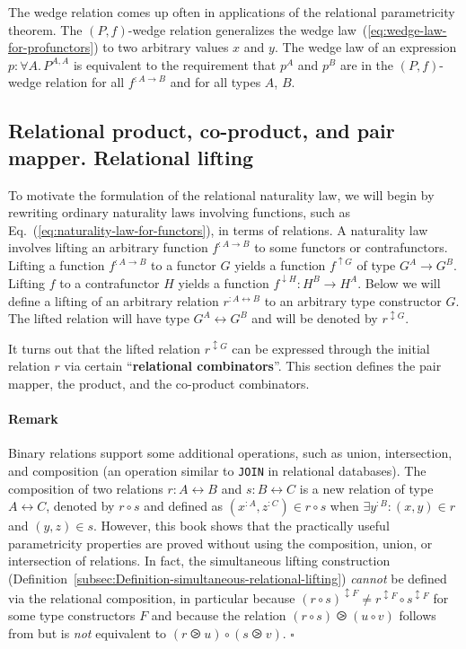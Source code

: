 The wedge relation comes up often in applications of the relational
parametricity theorem. The $\left(P,f\right)$-wedge relation generalizes
the wedge law~(\ref{eq:wedge-law-for-profunctors}) to two arbitrary
values $x$ and $y$. The wedge law of an expression $p:\forall A.\,P^{A,A}$
is equivalent to the requirement that $p^{A}$ and $p^{B}$ are in
the $\left(P,f\right)$-wedge relation for all $f^{:A\rightarrow B}$
and for all types $A$, $B$. 

\subsection{Relational product, co-product, and pair mapper. Relational lifting}

To motivate the formulation of the relational naturality law, we will
begin by rewriting ordinary naturality laws involving functions, such
as Eq.~(\ref{eq:naturality-law-for-functors}), in terms of relations.
A naturality law involves lifting an arbitrary function $f^{:A\rightarrow B}$
to some functors or contrafunctors. Lifting a function $f^{:A\rightarrow B}$
to a functor $G$ yields a function $f^{\uparrow G}$ of type $G^{A}\rightarrow G^{B}$.
Lifting $f$ to a contrafunctor $H$ yields a function $f^{\downarrow H}:H^{B}\rightarrow H^{A}$.
Below we will define a lifting of an arbitrary relation $r^{:A\leftrightarrow B}$
to an arbitrary type constructor $G$. The lifted relation will have
type $G^{A}\leftrightarrow G^{B}$ and will be denoted by $r^{\updownarrow G}$.

It turns out that the lifted relation $r^{\updownarrow G}$ can be
expressed through the initial relation $r$ via certain \textsf{``}\textbf{relational
combinators}\textsf{''}. This section defines
the pair mapper, the product, and the co-product combinators.

\paragraph{Remark}

Binary relations support some additional operations, such as union,
intersection, and composition (an operation similar to \lstinline!JOIN!
in relational databases). The composition of two relations $r:A\leftrightarrow B$
and $s:B\leftrightarrow C$ is a new relation of type $A\leftrightarrow C$,
denoted by $r\circ s$ and defined as $(x^{:A},z^{:C})\in r\circ s$
when $\exists y^{:B}:(x,y)\in r$ and $(y,z)\in s$. However, this
book shows that the practically useful parametricity properties are
proved without using the composition, union, or intersection of relations.
In fact, the simultaneous lifting construction (Definition~\ref{subsec:Definition-simultaneous-relational-lifting})
\emph{cannot} be defined via the relational composition, in particular
because $(r\circ s)^{\updownarrow F}\neq r^{\updownarrow F}\circ s^{\updownarrow F}$
for some type constructors $F$ and because the relation $(r\circ s)\ogreaterthan(u\circ v)$
follows from but is \emph{not} equivalent to $(r\ogreaterthan u)\circ(s\ogreaterthan v)$.
$\square$


